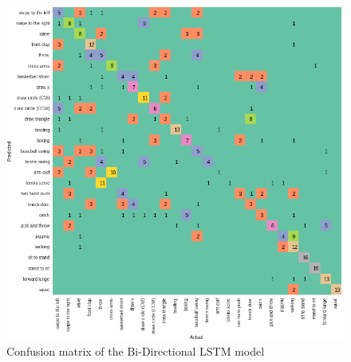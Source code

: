 \documentclass[conference]{IEEEtran}
\begin{document}
\begin{figure}[H]
\begin{center}
\includegraphics[scale=0.3]{bidirectional_LSTM/bidirectional_confusion_matrix.png}
\end{center}
\caption{\label{fig:confusion_matrix_bidirectional_LSTM} 
Confusion matrix of the Bi-Directional LSTM model}
\end{figure}
\end{document}
